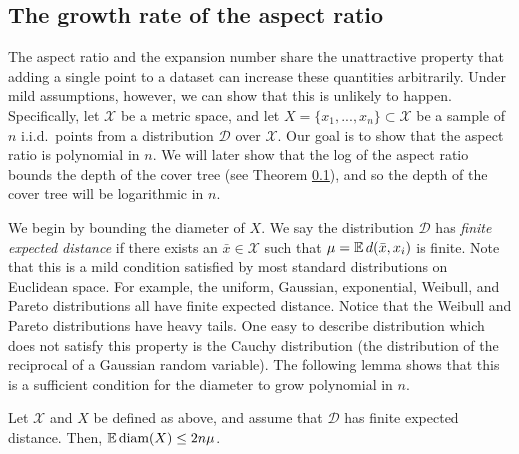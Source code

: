 \documentclass[../main.tex]{subfiles}
\newcommand{\set}[1]{\mathcal {#1}}
\newcommand{\distribution}[1]{\mathcal {#1}}
\newcommand{\dist}[2]{\distf({#1},{#2})}
\newcommand{\distf}{d}
\newcommand{\diam}[1]{\textnormal{diam}({#1})}
\begin{document}

\subsection{The growth rate of the aspect ratio}

The aspect ratio and the expansion number share the unattractive property that adding a single point to a dataset can increase these quantities arbitrarily.
Under mild assumptions, however, we can show that this is unlikely to happen.
Specifically, let $\set X$ be a metric space, 
and let $X=\{x_1,...,x_n\}\subset\set X$ be a sample of $n$ i.i.d.\ points from a distribution $\distribution D$ over $\set X$.
Our goal is to show that the aspect ratio is polynomial in $n$.
We will later show that the log of the aspect ratio bounds the depth of the cover tree (see Theorem \ref{}),
and so the depth of the cover tree will be logarithmic in $n$.

We begin by bounding the diameter of $X$.
We say the distribution $\distribution D$ has \emph{finite expected distance} if there exists an $\bar x\in\set X$ such that $\mu=\E\dist{\bar x}{x_i}$ is finite.
Note that this is a mild condition satisfied by most standard distributions on Euclidean space.
For example, the uniform, Gaussian, exponential, Weibull, and Pareto distributions all have finite expected distance.
Notice that the Weibull and Pareto distributions have heavy tails.
One easy to describe distribution which does not satisfy this property is the Cauchy distribution 
(the distribution of the reciprocal of a Gaussian random variable).
The following lemma shows that this is a sufficient condition for the diameter to grow polynomial in $n$.

\begin{lemma}
    \label{lemma:Ediam}
    Let $\set X$ and $X$ be defined as above,
    and assume that $\distribution D$ has finite expected distance.
    Then, $\E\diam{X} \le 2n\mu$.
\end{lemma}
\end{document}
